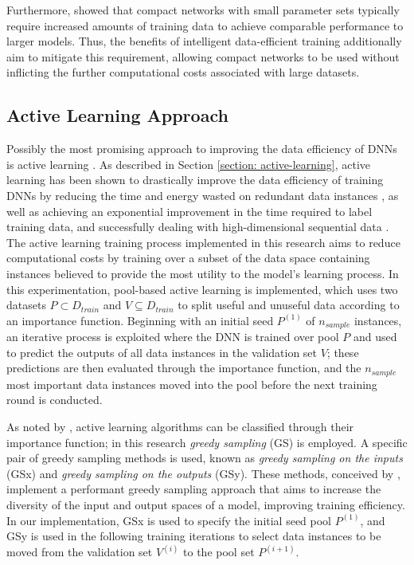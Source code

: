 \documentclass[a4paper, 11pt]{report}
\begin{document}
    Furthermore, \citet{bender-2021} showed that compact networks with small parameter sets typically require increased amounts of training data to achieve comparable performance to larger models. Thus, the benefits of intelligent data-efficient training additionally aim to mitigate this requirement, allowing compact networks to be used without inflicting the further computational costs associated with large datasets.


    \subsection{Active Learning Approach}
    \label{section: al-model}

    Possibly the most promising approach to improving the data efficiency of DNNs is active learning \citep{ren-2021}. As described in Section \ref{section: active-learning}, active learning has been shown to drastically improve the data efficiency of training DNNs by reducing the time and energy wasted on redundant data instances \citep{xu-2021}, as well as achieving an exponential improvement in the time required to label training data, and successfully dealing with high-dimensional sequential data \citep{ren-2021}. The active learning training process implemented in this research aims to reduce computational costs by training over a subset of the data space containing instances believed to provide the most utility to the model's learning process. In this experimentation, pool-based active learning is implemented, which uses two datasets $P \subset D_{train}$ and $V \subseteq D_{train}$ to split useful and unuseful data according to an importance function. Beginning with an initial seed $P^{(1)}$ of $n_{sample}$ instances, an iterative process is exploited where the DNN is trained over pool $P$ and used to predict the outputs of all data instances in the validation set $V$; these predictions are then evaluated through the importance function, and the $n_{sample}$ most important data instances moved into the pool before the next training round is conducted.

    As noted by \citet{xu-2021}, active learning algorithms can be classified through their importance function; in this research \emph{greedy sampling} (GS) is employed. A specific pair of greedy sampling methods is used, known as \emph{greedy sampling on the inputs} (GSx) and \emph{greedy sampling on the outputs} (GSy). These methods, conceived by \citet{wu-2019}, implement a performant greedy sampling approach that aims to increase the diversity of the input and output spaces of a model, improving training efficiency. In our implementation, GSx is used to specify the initial seed pool $P^{(1)}$, and GSy is used in the following training iterations to select data instances to be moved from the validation set $V^{(i)}$ to the pool set $P^{(i+1)}$. 
\end{document}
